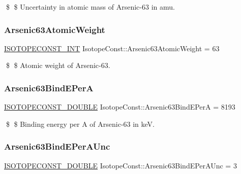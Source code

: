 \$ \$ Uncertainty in atomic mass of Arsenic-\/63 in amu. \mbox{\label{group___isotope_const-_arsenic-_as63_gaed6aedc30374644efa9203fdd9486f1e}} 
\subsubsection{\texorpdfstring{Arsenic63\+Atomic\+Weight}{Arsenic63AtomicWeight}}
{\footnotesize\ttfamily \mbox{\hyperlink{group___isotope_const-_macros_ga5f18360b3e99483a35c32d789e62621c}{I\+S\+O\+T\+O\+P\+E\+C\+O\+N\+S\+T\+\_\+\+I\+NT}} Isotope\+Const\+::\+Arsenic63\+Atomic\+Weight = 63}

\$ \$ Atomic weight of Arsenic-\/63. \mbox{\label{group___isotope_const-_arsenic-_as63_gaa7dee8a9ced42095bbdae56bf36613e9}} 
\subsubsection{\texorpdfstring{Arsenic63\+Bind\+E\+PerA}{Arsenic63BindEPerA}}
{\footnotesize\ttfamily \mbox{\hyperlink{group___isotope_const-_macros_ga8f45a7272ce02c0b4c65c44636ed719a}{I\+S\+O\+T\+O\+P\+E\+C\+O\+N\+S\+T\+\_\+\+D\+O\+U\+B\+LE}} Isotope\+Const\+::\+Arsenic63\+Bind\+E\+PerA = 8193}

\$ \$ Binding energy per A of Arsenic-\/63 in keV. \mbox{\label{group___isotope_const-_arsenic-_as63_gacf925ae28d6378b460c0f68ec54844a4}} 
\subsubsection{\texorpdfstring{Arsenic63\+Bind\+E\+Per\+A\+Unc}{Arsenic63BindEPerAUnc}}
{\footnotesize\ttfamily \mbox{\hyperlink{group___isotope_const-_macros_ga8f45a7272ce02c0b4c65c44636ed719a}{I\+S\+O\+T\+O\+P\+E\+C\+O\+N\+S\+T\+\_\+\+D\+O\+U\+B\+LE}} Isotope\+Const\+::\+Arsenic63\+Bind\+E\+Per\+A\+Unc = 3}

